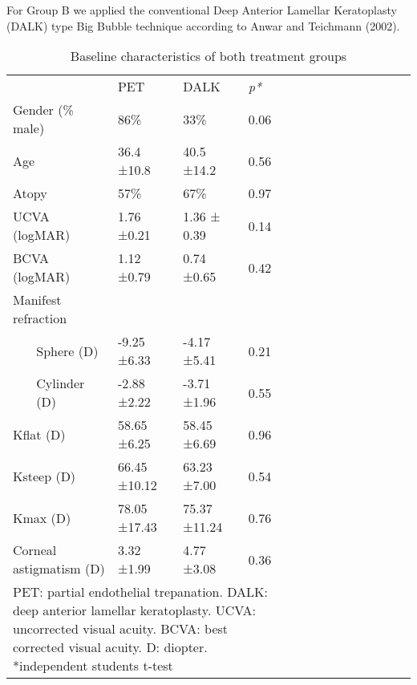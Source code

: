 \documentclass[authordate, empirical]{jote-new-article}
\begin{document}
	For Group B we applied the conventional Deep Anterior Lamellar Keratoplasty (DALK) type Big Bubble technique according to Anwar and Teichmann (2002).

	\begin{table}[H]
		\begin{fullwidth}
			\caption{Baseline characteristics of both treatment groups}
			\begin{tabularx}{\linewidth}{@{} l l l l l l l l l l l l l l l @{}}
				\toprule
	
			 	  &   & PET & DALK & \emph{p*} \\
	
			 	\multicolumn{2}{l}{Gender (\% male)} & 86\% & 33\% & 0.06 \\
	
			 	\multicolumn{2}{l}{Age} & 36.4 ±10.8 & 40.5 ±14.2 & 0.56 \\
	
			 	\multicolumn{2}{l}{Atopy} & 57\% & 67\% & 0.97 \\
	
			 	\multicolumn{2}{l}{UCVA (logMAR)} & 1.76 ±0.21 & 1.36 ± 0.39 & 0.14 \\
	
			 	\multicolumn{2}{l}{BCVA (logMAR)} & 1.12 ±0.79 & 0.74 ±0.65 & 0.42 \\
	
			 	\multicolumn{2}{l}{Manifest refraction} &   &   &   \\
	
			 	  & Sphere (D) & -9.25 ±6.33 & -4.17 ±5.41 & 0.21 \\
	
			 	  & Cylinder (D) & -2.88 ±2.22 & -3.71 ±1.96 & 0.55 \\
	
			 	\multicolumn{2}{l}{Kflat (D)} & 58.65 ±6.25 & 58.45 ±6.69 & 0.96 \\
	
			 	\multicolumn{2}{l}{Ksteep (D)} & 66.45 ±10.12 & 63.23 ±7.00 & 0.54 \\
	
			 	\multicolumn{2}{l}{Kmax (D)} & 78.05 ±17.43 & 75.37 ±11.24 & 0.76 \\
	
			 	\multicolumn{2}{l}{Corneal astigmatism (D)} & 3.32 ±1.99 & 4.77 ±3.08 & 0.36 \\
	
				\bottomrule
				\multicolumn{5}{l}{\parbox[t]{0.9\textwidth}{PET: partial endothelial trepanation. DALK: deep anterior lamellar keratoplasty. UCVA: uncorrected visual acuity. BCVA: best corrected visual acuity. D: diopter. *independent students t-test}}
			\end{tabularx}	
		\end{fullwidth}
	\end{table}
\end{document}
